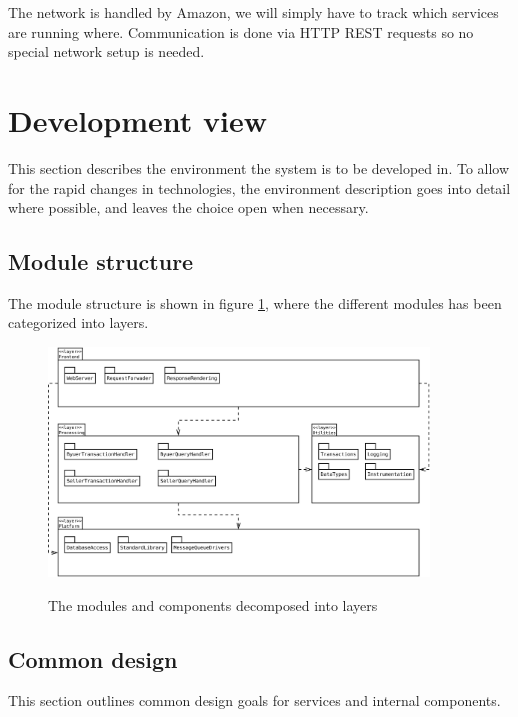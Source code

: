 The network is handled by Amazon, we will simply have to track which services
are running where. Communication is done via HTTP REST requests so no special
network setup is needed.

\section{Development view}
\label{sec:development-view}
This section describes the environment the system is to be developed in. To
allow for the rapid changes in technologies, the environment description goes
into detail where possible, and leaves the choice open when necessary.

\subsection{Module structure}
\label{sec:module-structure}
The module structure is shown in figure \ref{fig:dev_module_structure}, where
the different modules has been categorized into layers.

\begin{figure}[ht]
    \centering
    \includegraphics[width=0.9\textwidth]{figures/dev_module_structure}
    \label{fig:dev_module_structure}
    \caption{The modules and components decomposed into layers}
\end{figure}

\subsection{Common design}
\label{sec:common-design}
This section outlines common design goals for services and internal components.

